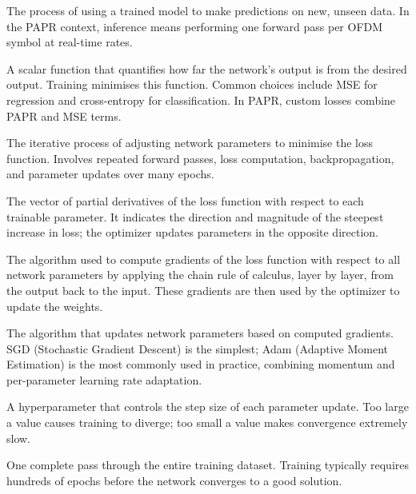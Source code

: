 \begin{description}[style=nextline, font=\normalfont\bfseries, leftmargin=1.5em]
    \item[Inference]
    The process of using a trained model to make predictions on new,
    unseen data.  In the PAPR context, inference means performing
    one forward pass per OFDM symbol at real-time rates.

    \item[Loss Function]
    A scalar function that quantifies how far the network's output
    is from the desired output.  Training minimises this function.
    Common choices include MSE for regression and cross-entropy for
    classification.  In PAPR, custom losses combine PAPR and MSE
    terms.

    \item[Training]
    The iterative process of adjusting network parameters to minimise
    the loss function.  Involves repeated forward passes,
    loss computation, backpropagation, and parameter updates
    over many epochs.

    \item[Gradient]
    The vector of partial derivatives of the loss function with
    respect to each trainable parameter.  It indicates the direction
    and magnitude of the steepest increase in loss; the optimizer
    updates parameters in the opposite direction.

    \item[Backpropagation]
    The algorithm used to compute gradients of the loss function with
    respect to all network parameters by applying the chain rule of
    calculus, layer by layer, from the output back to the input.
    These gradients are then used by the optimizer to update the
    weights.

    \item[Optimizer]
    The algorithm that updates network parameters based on computed
    gradients.  SGD (Stochastic Gradient Descent) is the simplest;
    Adam (Adaptive Moment Estimation) is the most commonly used in
    practice, combining momentum and per-parameter learning rate
    adaptation.

    \item[Learning Rate ($\eta$)]
    A hyperparameter that controls the step size of each parameter
    update.  Too large a value causes training to diverge; too small
    a value makes convergence extremely slow.

    \item[Epoch]
    One complete pass through the entire training dataset.  Training
    typically requires hundreds of epochs before the network converges
    to a good solution.


\end{description}
